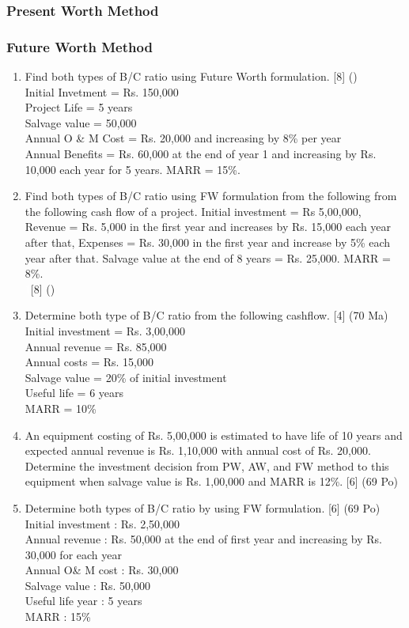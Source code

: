 \documentclass[12pt]{article}
\newcommand{\enter}{\\\textcolor{white}{1}}
\begin{document}
	\subsubsection{Present Worth Method}
	\subsubsection{Future Worth Method}
	\begin{enumerate}[noitemsep, topsep = 0pt]
		\item Find both types of B/C ratio using Future Worth formulation. \hfill [8] ()\\
		Initial Invetment = Rs. 150,000\\
		Project Life = 5 years\\
		Salvage value = 50,000\\
		Annual O \& M Cost = Rs. 20,000 and increasing by 8\% per year\\
		Annual Benefits = Rs. 60,000 at the end of year 1 and increasing by Rs. 10,000 each year for 5 years. MARR = 15\%.
		
		\item Find both types of B/C ratio using FW formulation from the following from the following cash flow of a project. Initial investment = Rs 5,00,000, Revenue = Rs. 5,000 in the first year and increases by Rs. 15,000 each year after that, Expenses = Rs. 30,000 in the first year and increase by 5\% each year after that. Salvage value at the end of 8 years = Rs. 25,000. MARR = 8\%. 
		\enter\hfill [8] ()
		
		\item Determine both type of B/C ratio from the following cashflow. \hfill [4] (70 Ma)\\
		Initial investment = Rs. 3,00,000\\
		Annual revenue = Rs. 85,000\\
		Annual costs = Rs. 15,000\\
		Salvage value = 20\% of initial investment\\
		Useful life = 6 years\\
		MARR = 10\%
		
		\item An equipment costing of Rs. 5,00,000 is estimated to have life of 10 years and expected annual revenue is Rs. 1,10,000 with annual cost of Rs. 20,000. Determine the investment decision from PW, AW, and FW method to this equipment when salvage value is Rs. 1,00,000 and MARR is 12\%. \hfill [6] (69 Po)
		
		\item Determine both types of B/C ratio by using FW formulation. \hfill [6] (69 Po)\\
		Initial investment : Rs. 2,50,000\\
		Annual revenue     : Rs. 50,000 at the end of first year and increasing by Rs. 30,000 for each year\\
		Annual O\& M cost  : Rs. 30,000\\
		Salvage value      : Rs. 50,000\\
		Useful life year   : 5 years\\
		MARR               : 15\%	
	\end{enumerate}
\end{document}
